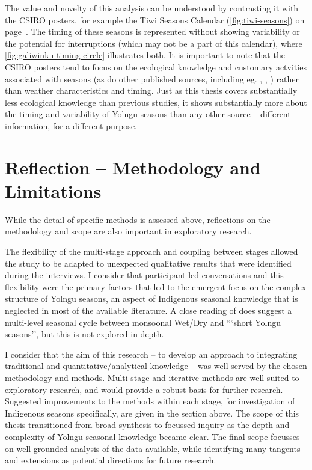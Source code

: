 
The value and novelty of this analysis can be understood by contrasting it with the CSIRO
posters, for example the Tiwi Seasons Calendar (\cref{fig:tiwi-seasons}) on
page~\pageref{fig:tiwi-seasons}.  The timing of these seasons is represented
without showing variability or the potential for interruptions (which may not
be a part of this calendar), where \cref{fig:galiwinku-timing-circle}
illustrates both.
%
It is important to note that the CSIRO posters tend to focus on the ecological knowledge and
customary actvities associated with seasons (as do other published sources,
including eg. \citealp{barber2005}, , \citealp{davis1989}) rather than weather
characteristics and timing.  Just as this thesis covers substantially less
ecological knowledge than previous studies, it shows substantially more
about the timing and variability of Yolngu seasons than any other source --
different information, for a different purpose.


\section{Reflection -- Methodology and Limitations}
\label{sec:disc-reflection}

While the detail of specific methods is assessed above, reflections on the
methodology and scope are also important in exploratory research.

The flexibility of the multi-stage approach and coupling between stages
allowed the study to be adapted to unexpected qualitative results that were
identified during the interviews.  I consider
that participant-led conversations and this flexibility were the primary
factors that led to the emergent focus on the complex structure of
Yolngu seasons, an aspect of Indigenous seasonal knowledge that is neglected
in most of the available literature.  A close reading of \citet[][eg. p89]{barber2005}
does suggest a multi-level seasonal cycle between monsoonal Wet/Dry and
```short Yolngu seasons'', but this is not explored in depth.

I consider that the aim of this research -- to develop an approach to
integrating traditional and quantitative/analytical knowledge -- was well
served by the chosen methodology and methods.  Multi-stage and iterative
methods are well suited to exploratory research, and would provide a robust
basis for further research.  Suggested improvements to the methods within
each stage, for investigation of Indigenous seasons specifically, are given
in the section above.  The scope of this thesis transitioned from broad
synthesis to focussed inquiry as the depth and complexity of Yolngu seasonal
knowledge became clear.  The final scope focusses on well-grounded analysis
of the data available, while identifying many tangents and extensions as
potential directions for future research.

